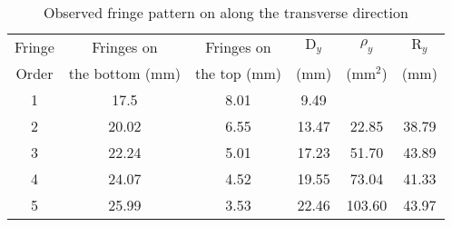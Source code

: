 \begin{table}[H]
    \centering
    \begin{tabular}{|c|c|c|c|c|c|}
        \hline
        Fringe    & Fringes on     & Fringes on       & $\text{D}_y$        & $\rho_y$   & $\text{R}_y$    \\ 
        Order     & the bottom (mm)  & the top (mm)   & (mm)       & ($\text{mm}^2$)   & (mm)   \\ \hline
        1 & 17.5 & 8.01  &  9.49 &       &     \\
        2 & 20.02 & 6.55 & 13.47 &  22.85 & 38.79 \\
        3 & 22.24 & 5.01 & 17.23 &  51.70 & 43.89 \\
        4 & 24.07 & 4.52 & 19.55 &  73.04 & 41.33 \\
        5 & 25.99 & 3.53 & 22.46 & 103.60 & 43.97 \\
        \hline
       \end{tabular}
    \caption{Observed fringe pattern on along the transverse direction}
    \label{tab:4}
\end{table}